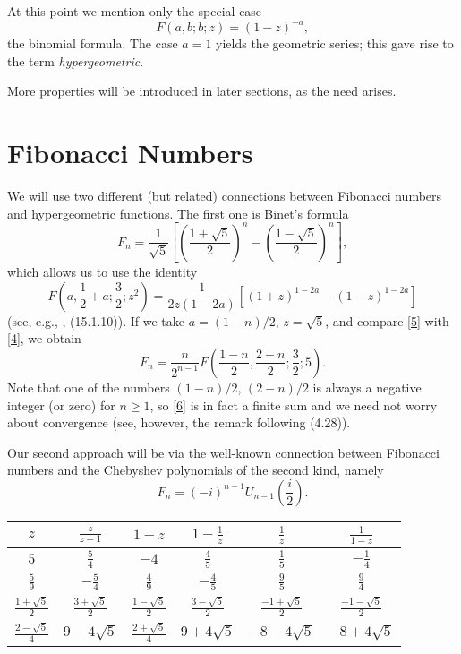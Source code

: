 \documentclass[11pt,reqno]{amsart}
\theoremstyle{plain}
\numberwithin{equation}{section}
\begin{document}
At this point we mention only the special case
\begin{equation}\label{3}
F(a, b; b; z) = (1-z)^{-a} ,
\end{equation}
the binomial formula.  The case $a=1$ yields the geometric series;
this gave rise to the term \textit{hypergeometric}.

More properties will be introduced in later sections, as the need
arises.

\section{Fibonacci Numbers}

We will use two different (but related) connections between
Fibonacci numbers and hypergeometric functions.  The first one is
Binet's formula
\begin{equation}\label{4}
F_n = \frac{1}{\sqrt 5} \left[ \left( \frac{1+\sqrt 5}{2} \right) ^n
- \left( \frac{1 - \sqrt 5}{2} \right) ^n \right] ,
\end{equation}
which allows us to use the identity
\begin{equation}\label{5}
F \left( a, \frac{1}{2} + a; \frac{3}{2}; z^2 \right) =
\frac{1}{2z(1-2a)} \left[ (1+z)^{1-2a} - (1-z)^{1-2a} \right]
\end{equation}
(see, e.g., \cite{abram}, (15.1.10)).  If we take $a=(1-n)/2$,
$z=\sqrt 5$, and compare \eqref{5} with \eqref{4}, we obtain
\begin{equation}\label{6}
F_n = \frac{n}{2^{n-1}} F \left( \frac{1-n}{2}, \frac{2-n}{2};
\frac{3}{2}; 5 \right) .
\end{equation}
Note that one of the numbers $(1-n)/2$, $(2-n)/2$ is always a
negative integer (or zero) for $n \ge 1$, so \eqref{6} is in fact a
finite sum and we need not worry about convergence (see, however,
the remark following (4.28)).

Our second approach will be via the well-known connection between
Fibonacci numbers and the Chebyshev polynomials of the second kind,
namely
\begin{equation}\label{7}
F_n = (-i)^{n-1} U_{n-1} \left( \frac{i}{2} \right) .
\end{equation}

\begin{center}
\begin{tabular}{|c|c|c|c|c|c|}
\hline $z$ & $\frac{z}{z-1}$ & $1-z$ & $1-\frac{1}{z}$ &
$\frac{1}{z}$ & $\frac{1}{1-z}$ \\ \hline \hline $5$ & $\frac{5}{4}$
& $-4$ & $\frac{4}{5}$ & $\frac{1}{5}$ & $-\frac{1}{4}$ \\ \hline
$\frac{5}{9}$ & $-\frac{5}{4}$ & $\frac{4}{9}$ & $-\frac{4}{5}$ &
$\frac{9}{5}$ & $\frac{9}{4}$ \\ \hline $\frac{1+\sqrt 5}{2}$ &
$\frac{3+\sqrt 5}{2}$ & $\frac{1-\sqrt 5}{2}$ & $\frac{3-\sqrt
5}{2}$ & $\frac{-1+\sqrt 5}{2}$ & $\frac{-1-\sqrt 5}{2}$ \\ \hline
$\frac{2-\sqrt 5}{4}$ & $9 - 4 \sqrt 5$ & $\frac{2+\sqrt 5}{4}$ & $9
+ 4 \sqrt 5$ & $-8 - 4\sqrt 5$ & $-8 + 4 \sqrt 5$ \\ \hline
\end{tabular}
\end{center}
\end{document}
